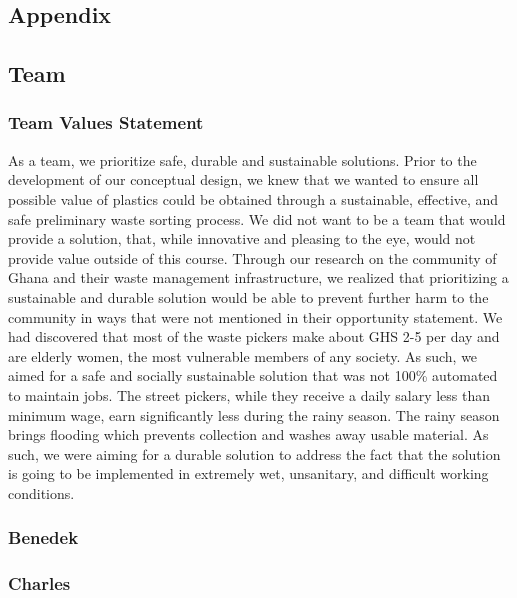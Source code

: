 \documentclass[12pt]{article}
\begin{document}
\begin{multicols*}{2}
    \newpage

    
    

    \newpage

    \section{Appendix}
        \subsection{Team}
            \subsubsection{Team Values Statement} \label{subsubsec:TVS}
            As a team, we prioritize safe, durable and sustainable solutions. Prior to the development of our conceptual design, we knew that we wanted to ensure all possible value of plastics could be obtained through a sustainable, effective, and safe preliminary waste sorting process. We did not want to be a team that would provide a solution, that, while innovative and pleasing to the eye, would not provide value outside of this course. 
            Through our research on the community of Ghana and their waste management infrastructure, we realized that prioritizing a sustainable and durable solution would be able to prevent further harm to the community in ways that were not mentioned in their opportunity statement. We had discovered that most of the waste pickers make about GHS 2-5 per day and are elderly women, the most vulnerable members of any society. As such, we aimed for a safe and socially sustainable solution that was not 100\% automated to maintain jobs. 
            The street pickers, while they receive a daily salary less than minimum wage, earn significantly less during the rainy season. The rainy season brings flooding which prevents collection and washes away usable material. As such, we were aiming for a durable solution to address the fact that the solution is going to be implemented in extremely wet, unsanitary, and difficult working conditions.

            \subsubsection{Benedek}

            \subsubsection{Charles}


\end{multicols*}
\end{document}
